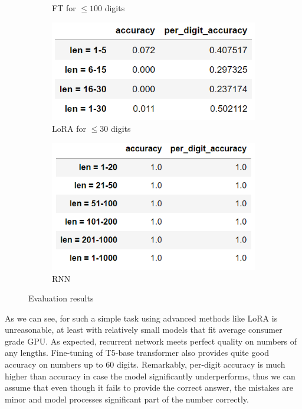\documentclass[a4paper,12pt]{article}
\begin{document}
\begin{figure}[h!]
\begin{subfigure}[h]{0.5\linewidth}
				\caption{FT for $\leqslant 100$ digits}
			\end{subfigure}
			\hfill
			\begin{subfigure}[h]{0.5\linewidth}
				\centering
				\includegraphics[scale=0.5]{figures/t5-large_lora_metrics_30.png}
				\caption{LoRA for $\leqslant 30$ digits}
			\end{subfigure}
		\begin{subfigure}[h]{0.5\linewidth}
			\centering
			\includegraphics[scale=0.5]{figures/RNN_metrics.png}
			\caption{RNN}
		\end{subfigure}
			\caption{Evaluation results}	
		\end{figure}
	
	As we can see, for such a simple task using advanced methods like LoRA is unreasonable, at least with relatively small models that fit average consumer grade GPU. As expected, recurrent network meets perfect quality on numbers of any lengths. Fine-tuning of T5-base transformer also provides quite good accuracy on numbers up to 60 digits. Remarkably, per-digit accuracy is much higher than accuracy in case the model significantly underperforms, thus we can assume that even though it fails to provide the correct answer, the mistakes are minor and model processes significant part of the number correctly.
\end{document}
